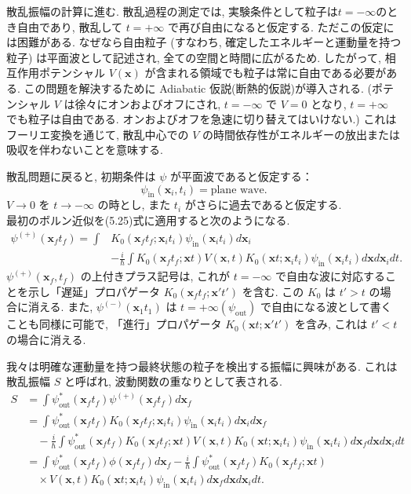 \documentclass{jsarticle}
\begin{document}
\color{black}
散乱振幅の計算に進む. 散乱過程の測定では, 実験条件として粒子は$t = -\infty$のとき自由であり, 散乱して $t = +\infty$ で再び自由になると仮定する. ただこの仮定には困難がある. なぜなら自由粒子 (すなわち, 確定したエネルギーと運動量を持つ粒子) は平面波として記述され, 全ての空間と時間に広がるため. したがって, 相互作用ポテンシャル $V(\mathbf{x})$ が含まれる領域でも粒子は常に自由である必要がある. この問題を解決するために Adiabatic 仮説(断熱的仮説)が導入される. (ポテンシャル $V$ は徐々にオンおよびオフにされ, $t = -\infty$ で $V = 0$ となり, $t = +\infty$ でも粒子は自由である. オンおよびオフを急速に切り替えてはいけない.) これはフーリエ変換を通じて, 散乱中心での $V$ の時間依存性がエネルギーの放出または吸収を伴わないことを意味する.\par
散乱問題に戻ると, 初期条件は $\psi$ が平面波であると仮定する：
\begin{equation*}
    \psi_{\textrm{in}}(\mathbf{x}_i,t_i) = \textrm{plane wave}.
\end{equation*}
$V \to 0$ を $t \to -\infty$ の時とし, また $t_i$ がさらに過去であると仮定する.\\
最初のボルン近似を(5.25)式に適用すると次のようになる.
\begin{align*}
    \psi^{(+)}(\mathbf{x}_{f} t_{f}) = \int &K_0(\mathbf{x}_f t_f; \mathbf{x}_i t_i) \psi_{\textrm{in}}(\mathbf{x}_i t_i) d\mathbf{x}_i\\
    &- \frac{i}{\hbar} \int K_0(\mathbf{x}_f t_f; \mathbf{x}t)V(\mathbf{x},t)K_0(\mathbf{x}t;\mathbf{x}_i t_i)\psi_{\textrm{in}}(\mathbf{x}_i t_i)d\mathbf{x} d\mathbf{x}_i dt. \tag{5.30}
\end{align*}
$\psi^{(+)}(\mathbf{x}_f,t_f)$ の上付きプラス記号は, これが $t = -\infty$ で自由な波に対応することを示し「遅延」プロパゲータ $K_0(\mathbf{x}_f t_f; \mathbf{x}'t')$ を含む. この $K_0$ は $t' > t$ の場合に消える. また, $\psi^{(-)}(\mathbf{x}_1 t_1)$ は $t = +\infty (\psi_{\textrm{out}})$ で自由になる波として書くことも同様に可能で, 「進行」プロパゲータ $K_0(\mathbf{x} t; \mathbf{x}'t')$ を含み, これは $t' < t$ の場合に消える.\par
我々は明確な運動量を持つ最終状態の粒子を検出する振幅に興味がある. これは散乱振幅 $S$ と呼ばれ, 波動関数の重なりとして表される.
\begin{align*}
    S &= \int \psi_{\textrm{out}}^{*}(\mathbf{x}_f t_f)\psi^{(+)}(\mathbf{x}_f t_f)d\mathbf{x}_f\\
    &= \int \psi_{\textrm{out}}^{*}(\mathbf{x}_f t_f)K_0(\mathbf{x}_f t_f; \mathbf{x}_i t_i)\psi_{\textrm{in}}(\mathbf{x}_i t_i)d\mathbf{x}_i d\mathbf{x}_f\\
    &\quad -\frac{i}{\hbar} \int \psi_{\textrm{out}}^{*}(\mathbf{x}_f t_f)K_0(\mathbf{x}_f t_f; \mathbf{x}t)V(\mathbf{x},t)K_0(\mathbf{x}t; \mathbf{x}_i t_i)\psi_{\textrm{in}}(\mathbf{x}_i t_i)d\mathbf{x}_f d\mathbf{x} d\mathbf{x}_i dt\\
    &= \int \psi_{\textrm{out}}^{*}(\mathbf{x}_f t_f)\phi(\mathbf{x}_f t_f)d\mathbf{x}_f -\frac{i}{\hbar} \int \psi_{\textrm{out}}^{*}(\mathbf{x}_f t_f)K_0 (\mathbf{x}_f t_f; \mathbf{x}t)\\
    &\quad \times V(\mathbf{x}, t)K_0 (\mathbf{x} t; \mathbf{x}_i t_i)\psi_{\textrm{in}}(\mathbf{x}_i t_i)d\mathbf{x}_f d\mathbf{x} d\mathbf{x}_i dt. \tag{5.31}
\end{align*}
\end{document}
